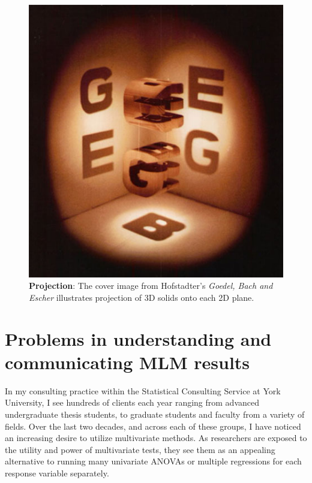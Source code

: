 \documentclass[
  letterpaper,
  10pt,
  krantz2]{krantz}
\begin{document}
\begin{figure}

{\centering \includegraphics{images/Cover-image-GBE.png}

}

\caption{\textbf{Projection}: The cover image from Hofstadter's
\emph{Goedel, Bach and Escher} illustrates projection of 3D solids onto
each 2D plane.}

\end{figure}

\hypertarget{sec-problems}{%
\section{Problems in understanding and communicating MLM
results}\label{sec-problems}}

In my consulting practice within the Statistical Consulting Service at
York University, I see hundreds of clients each year ranging from
advanced undergraduate thesis students, to graduate students and faculty
from a variety of fields. Over the last two decades, and across each of
these groups, I have noticed an increasing desire to utilize
multivariate methods. As researchers are exposed to the utility and
power of multivariate tests, they see them as an appealing alternative
to running many univariate ANOVAs or multiple regressions for each
response variable separately.
\end{document}
